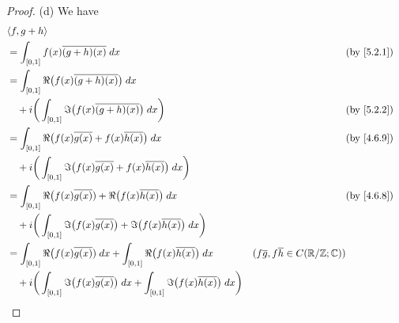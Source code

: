 \begin{proof}{(d)}
  We have
  \begin{align*}
     & \inner*{f, g + h}                                                                                                                                                                                       \\
     & = \int_{[0, 1]} f(x) \overline{(g + h)(x)} \; dx                                                                                    &                                                      & \by{5.2.1} \\
     & = \int_{[0, 1]} \Re\big(f(x) \overline{(g + h)(x)}\big) \; dx                                                                                                                                           \\
     & \quad + i \bigg(\int_{[0, 1]} \Im\big(f(x) \overline{(g + h)(x)}\big) \; dx\bigg)                                                   &                                                      & \by{5.2.2} \\
     & = \int_{[0, 1]} \Re\big(f(x) \overline{g(x)} + f(x) \overline{h(x)}\big) \; dx                                                      &                                                      & \by{4.6.9} \\
     & \quad + i \bigg(\int_{[0, 1]} \Im\big(f(x) \overline{g(x)} + f(x) \overline{h(x)}\big) \; dx\bigg)                                                                                                      \\
     & = \int_{[0, 1]} \Re\big(f(x) \overline{g(x)}) + \Re\big(f(x) \overline{h(x)}\big) \; dx                                             &                                                      & \by{4.6.8} \\
     & \quad + i \bigg(\int_{[0, 1]} \Im\big(f(x) \overline{g(x)}\big) + \Im\big(f(x) \overline{h(x)}\big) \; dx\bigg)                                                                                         \\
     & = \int_{[0, 1]} \Re\big(f(x) \overline{g(x)}) \; dx + \int_{[0, 1]} \Re\big(f(x) \overline{h(x)}\big) \; dx                         & (f \overline{g}, f \overline{h} \in C(\R / \Z ; \C))              \\
     & \quad + i \bigg(\int_{[0, 1]} \Im\big(f(x) \overline{g(x)}\big) \; dx + \int_{[0, 1]} \Im\big(f(x) \overline{h(x)}\big) \; dx\bigg)                                                                     \\

\end{align*}
\end{proof}

